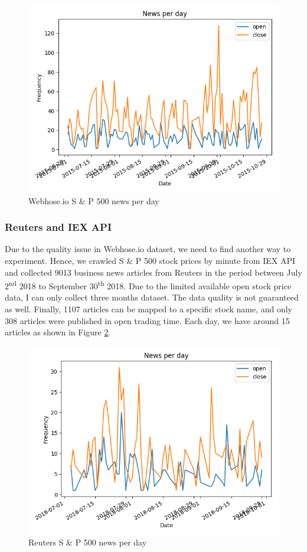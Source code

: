 \documentclass[sigconf]{acmart}
\newcommand{\ts}{\textsuperscript}
\begin{document}
\begin{figure}
  \includegraphics[width=\linewidth]{../../picture/webhose_500_news_per_day.png}
  \caption{Webhose.io S \& P 500 news per day}
  \label{fig:web_per_day}
\end{figure}

\subsubsection{Reuters and IEX API}
Due to the quality issue in Webhose.io dataset, we need to find another way to experiment. Hence, we crawled S \& P 500 stock prices by minute from IEX API \cite{IEX} and collected 9013 business news articles
from Reuters \cite{reuters} in the period between July 2\ts{nd} 2018 to September 30\ts{th} 2018. Due to the limited available open stock price data, I can only collect three months dataset. The data quality is not
guaranteed as well. Finally, 1107 articles can be mapped to a specific stock name, and only 308 articles were published in open trading time. Each day, we have around 15 articles as shown in Figure \ref{fig:re_per_day}.

\begin{figure}
  \includegraphics[width=\linewidth]{../../picture/reuter_news_per_day.png}
  \caption{Reuters S \& P 500 news per day}
  \label{fig:re_per_day}
\end{figure}
\end{document}
